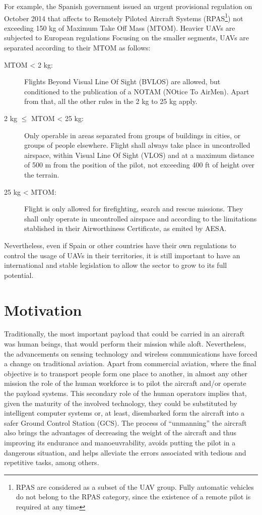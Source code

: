 For example, the Spanish government issued an urgent provisional regulation on October 2014 \cite{ley182014de15deoctubredeaprobaciondemedidasurgentesparaelcrecimientolacompetitividadylaeficiencia2014} that affects to Remotely Piloted Aircraft Systems (RPAS\footnote{RPAS are considered as a subset of the UAV group. Fully automatic vehicles do not belong to the RPAS category, since the existence of a remote pilot is required at any time}) not exceeding 150 kg of Maximum Take Off Mass (MTOM). Heavier UAVs are subjected to European regulations \cite{regulationecno21620082008}
Focusing on the smaller segments, UAVs are separated according to their MTOM as follows:
\begin{description}
	\item[MTOM < 2 kg:] Flights Beyond Visual Line Of Sight (BVLOS) are allowed, but conditioned to the publication of a NOTAM (NOtice To AirMen). Apart from that, all the other rules in the 2 kg to 25 kg apply.
	\item[2 kg $\leq$ MTOM < 25 kg:] Only operable in areas separated from groups of buildings in cities, or groups of people elsewhere. Flight shall always take place in uncontrolled airspace, within Visual Line Of Sight (VLOS) and at a maximum distance of 500 m from the position of the pilot, not exceeding 400 ft of height over the terrain.
	\item[25 kg < MTOM:] Flight is only allowed for firefighting, search and rescue missions. They shall only operate in uncontrolled airspace and according to the limitations stablished in their Airworthiness Certificate, as emited by AESA.
\end{description}
Nevertheless, even if Spain or other countries have their own regulations to control the usage of UAVs in their territories, it is still important to have an international and stable legislation to allow the sector to grow to its full potential.


\section{Motivation}\label{sec:motivation}

Traditionally, the most important payload that could be carried in an aircraft was human beings, that would perform their mission while aloft.
Nevertheless, the advancements on sensing technology and wireless communications have forced a change on traditional aviation.
Apart from commercial aviation, where the final objective is to transport people form one place to another, in almost any other mission the role of the human workforce is to pilot the aircraft and/or operate the payload systems.
This secondary role of the human operators implies that, given the maturity of the involved technology, they could be substituted by intelligent computer systems or, at least, disembarked form the aircraft into a safer Ground Control Station (GCS).
The process of ``unmanning'' the aircraft also brings the advantages of decreasing the weight of the aircraft and thus improving its endurance and manoeuvrability, avoids putting the pilot in a dangerous situation, and helps alleviate the errors associated with tedious and repetitive tasks, among others.

